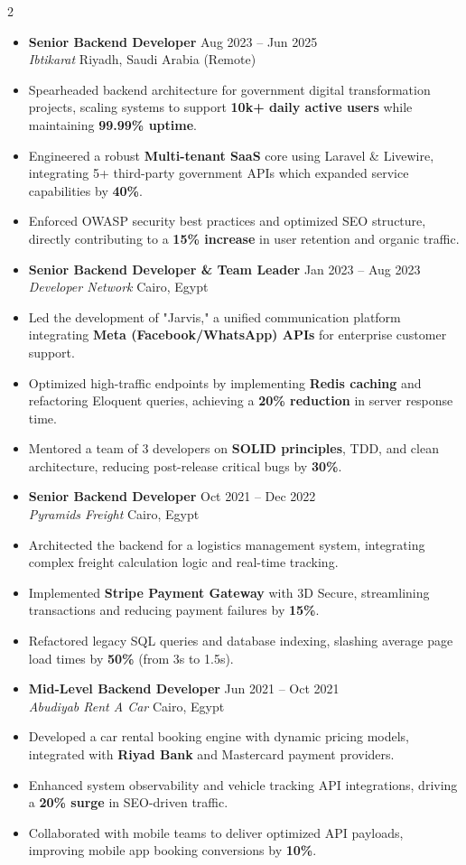 \documentclass[10pt, a4paper]{article}
\newcommand{\resumeItem}[1]{
  \item\small{
    {#1 \vspace{3pt}} %
  }
}
\newcommand{\resumeSubheading}[4]{
  \vspace{10pt} %
  \item
    \textbf{#1} \hfill {\footnotesize #2} \\ 
    \textit{\small #3} \hfill {\footnotesize #4} \\
    \vspace{4pt}
}
\begin{document}
\begin{paracol}{2}
\begin{itemize}[leftmargin=0.15in, label={}]
    \resumeSubheading
      {Senior Backend Developer}{Aug 2023 -- Jun 2025 }
      {Ibtikarat}{Riyadh, Saudi Arabia (Remote)}
      \resumeItem{Spearheaded backend architecture for government digital transformation projects, scaling systems to support \textbf{10k+ daily active users} while maintaining \textbf{99.99\% uptime}.}
      \resumeItem{Engineered a robust \textbf{Multi-tenant SaaS} core using Laravel \& Livewire, integrating 5+ third-party government APIs which expanded service capabilities by \textbf{40\%}.}
      \resumeItem{Enforced OWASP security best practices and optimized SEO structure, directly contributing to a \textbf{15\% increase} in user retention and organic traffic.}

    \resumeSubheading
      {Senior Backend Developer \& Team Leader}{Jan 2023 -- Aug 2023}
      {Developer Network}{Cairo, Egypt}
      \resumeItem{Led the development of "Jarvis," a unified communication platform integrating \textbf{Meta (Facebook/WhatsApp) APIs} for enterprise customer support.}
      \resumeItem{Optimized high-traffic endpoints by implementing \textbf{Redis caching} and refactoring Eloquent queries, achieving a \textbf{20\% reduction} in server response time.}
      \resumeItem{Mentored a team of 3 developers on \textbf{SOLID principles}, TDD, and clean architecture, reducing post-release critical bugs by \textbf{30\%}.}

    \resumeSubheading
      {Senior Backend Developer}{Oct 2021 -- Dec 2022}
      {Pyramids Freight}{Cairo, Egypt}
      \resumeItem{Architected the backend for a logistics management system, integrating complex freight calculation logic and real-time tracking.}
      \resumeItem{Implemented \textbf{Stripe Payment Gateway} with 3D Secure, streamlining transactions and reducing payment failures by \textbf{15\%}.}
      \resumeItem{Refactored legacy SQL queries and database indexing, slashing average page load times by \textbf{50\%} (from 3s to 1.5s).}

    \resumeSubheading
      {Mid-Level Backend Developer}{Jun 2021 -- Oct 2021}
      {Abudiyab Rent A Car}{Cairo, Egypt}
      \resumeItem{Developed a car rental booking engine with dynamic pricing models, integrated with \textbf{Riyad Bank} and Mastercard payment providers.}
      \resumeItem{Enhanced system observability and vehicle tracking API integrations, driving a \textbf{20\% surge} in SEO-driven traffic.}
      \resumeItem{Collaborated with mobile teams to deliver optimized API payloads, improving mobile app booking conversions by \textbf{10\%}.}


\end{itemize}
\end{paracol}
\end{document}
